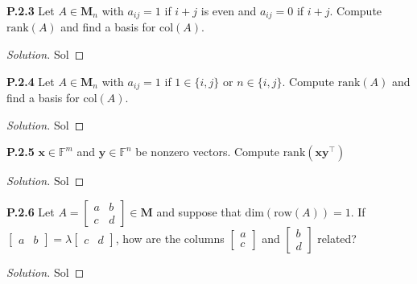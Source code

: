 \documentclass[12pt]{amsart}
\newenvironment{solution}
{\begin{proof}[Solution]}
{\end{proof}}
\begin{document}
\begin{onehalfspace}
        \noindent\textbf{P.2.3} Let $A\in\mathbf{M}_n$ with $a_{ij} = 1$ if $i + j$ is even and $a_{ij} = 0$ if $i + j$.
        Compute $\text{rank}(A)$ and find a basis for $\text{col}(A)$.
        \begin{solution}
            Sol
        \end{solution}

        \noindent\textbf{P.2.4} Let $A\in\mathbf{M}_n$ with $a_{ij} = 1$ if $1\in\{i,j\}$ or $n\in\{i,j\}$. Compute
        $\text{rank}(A)$ and find a basis for $\text{col}(A)$.
        \begin{solution}
            Sol
        \end{solution}

        \noindent\textbf{P.2.5} $\mathbf{x}\in\mathbb{F}^m$ and $\mathbf{y}\in\mathbb{F}^n$ be nonzero vectors.
        Compute $\text{rank}(\textbf{x}\textbf{y}^\top)$
        \begin{solution}
            Sol
        \end{solution}

        \noindent\textbf{P.2.6} Let $A = \left[\begin{matrix}a & b\\ c & d\end{matrix}\right]\in\mathbf{M}$ and suppose that
        $\text{dim}(\text{row}(A)) = 1$. If $[\begin{matrix}a & b\end{matrix}] = \lambda[\begin{matrix}c & d\end{matrix}]$,
        how are the columns $\left[\begin{matrix}a \\ c\end{matrix}\right]$ and $\left[\begin{matrix}b \\ d\end{matrix}\right]$
        related?
        \begin{solution}
            Sol
        \end{solution}

    \end{onehalfspace}
\end{document}
